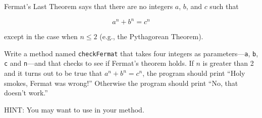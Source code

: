 \documentclass[12pt]{book}
\begin{document}
\begin{exercise}
Fermat's Last Theorem says that there are no integers $a$, $b$, and $c$ such that

\[ a^n + b^n = c^n \]

except in the case when $n \leq 2$ (e.g., the Pythagorean Theorem).

Write a method named {\tt checkFermat} that takes four integers as parameters---{\tt a}, {\tt b}, {\tt c} and {\tt n}---and that checks to see if Fermat's theorem holds.
If $n$ is greater than 2 and it turns out to be true that $a^n + b^n = c^n$, the program should print ``Holy smokes, Fermat was wrong!''
Otherwise the program should print ``No, that doesn't work.''

HINT: You may want to use  in your method.
\end{exercise}
\end{document}
